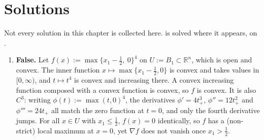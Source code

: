 
\section{Solutions}
\label{sec:convexity_solutions}

Not every solution in this chapter is collected here.  is
solved where it appears, on .

\begin{exercisesolution}
\label{sol:convexity_properties_multiple_choice}
\begin{enumerate}[label=\textbf{(\alph*)}]
  \item \textbf{False.} Let $f(x) := \max\{x_1 - \tfrac12,\ 0\}^4$ on
    $U := B_1 \subset \mathbb{R}^n$, which is open and convex.
    The inner function $x \mapsto \max\{x_1-\tfrac12,0\}$ is convex and takes values in
    $[0,\infty)$, and $t \mapsto t^4$ is convex and increasing there. A convex
    increasing function composed with a convex function is convex, so $f$ is convex. It is also
    $C^3$: writing $\phi(t) := \max(t,0)^4$, the derivatives $\phi' = 4t_+^3$,
    $\phi'' = 12t_+^2$ and $\phi''' = 24t_+$ all match the zero function at $t=0$, and only the
    fourth derivative jumps. For all $x \in U$ with $x_1 \leq \tfrac12$,
    $f(x) = 0$ identically, so $f$ has a (non-strict) local maximum at $x=0$, yet
    $\nabla f$ does not vanish once $x_1 > \tfrac12$.


\end{enumerate}
\end{exercisesolution}
